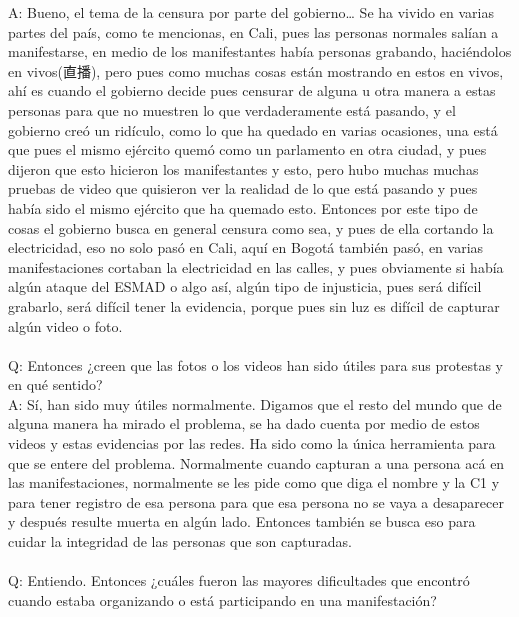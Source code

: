 \documentclass{phyasgn}\usepackage{nag}
\begin{document}
A: Bueno, el tema de la censura por parte del gobierno… Se ha vivido en varias partes del país, como te mencionas, en Cali, pues las personas normales salían a manifestarse, en medio de los manifestantes había personas grabando, haciéndolos en vivos(直播), pero pues como muchas cosas están mostrando en estos en vivos, ahí es cuando el gobierno decide pues censurar de alguna u otra manera a estas personas para que no muestren lo que verdaderamente está pasando, y el gobierno creó un ridículo, como lo que ha quedado en varias ocasiones, una está que pues el mismo ejército quemó como un parlamento en otra ciudad, y pues dijeron que esto hicieron los manifestantes y esto, pero hubo muchas muchas pruebas de video que quisieron ver la realidad de lo que está pasando y pues había sido el mismo ejército que ha quemado esto. Entonces por este tipo de cosas el gobierno busca en general censura como sea, y pues de ella cortando la electricidad, eso no solo pasó en Cali, aquí en Bogotá también pasó, en varias manifestaciones cortaban la electricidad en las calles, y pues obviamente si había algún ataque del ESMAD o algo así, algún tipo de injusticia, pues será difícil grabarlo, será difícil tener la evidencia, porque pues sin luz es difícil de capturar algún video o foto. \\
\\
Q: Entonces ¿creen que las fotos o los videos han sido útiles para sus protestas y en qué sentido?\\
A: Sí, han sido muy útiles normalmente. Digamos que el resto del mundo que de alguna manera ha mirado el problema, se ha dado cuenta por medio de estos videos y estas evidencias por las redes. Ha sido como la única herramienta para que se entere del problema. Normalmente cuando capturan a una persona acá en las manifestaciones, normalmente se les pide como que diga el nombre y la C1 y para tener registro de esa persona para que esa persona no se vaya a desaparecer y después resulte muerta en algún lado. Entonces también se busca eso para cuidar la integridad de las personas que son capturadas.\\
\\
Q: Entiendo. Entonces ¿cuáles fueron las mayores dificultades que encontró cuando estaba organizando o está participando en una manifestación?\\
\end{document}
